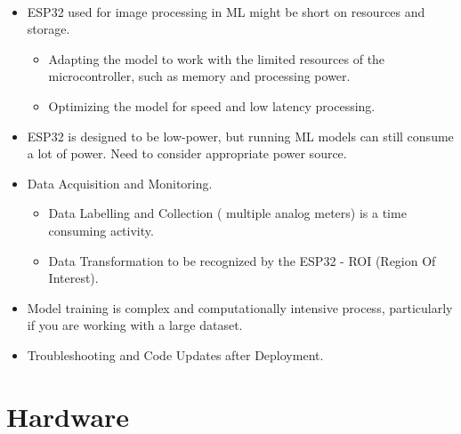 \STANDARD{\insertsection}
{ 
	\framesubtitle{\insertsubsection}
	
	
	\begin{itemize} 
		\item ESP32 used for image processing in ML might be short on resources and storage.
		\begin{itemize} 
			\item Adapting the model to work with the limited resources of the microcontroller, such as memory and processing power.
			\item Optimizing the model for speed and low latency processing.
		\end{itemize}
		\item ESP32 is designed to be low-power, but running ML models can still consume a lot of power. Need to consider appropriate power source.
		\framebreak
		\item Data Acquisition and Monitoring.
		\begin{itemize} 
			\item Data Labelling and Collection ( multiple analog meters) is a time consuming activity.
			\item Data Transformation to be recognized by the ESP32 - ROI (Region Of Interest). 
		\end{itemize} 
		\item Model training is complex and computationally intensive process, particularly if you are working with a large dataset.
		\item Troubleshooting and Code Updates after Deployment.  
	\end{itemize}
	
}

\section{Hardware}

